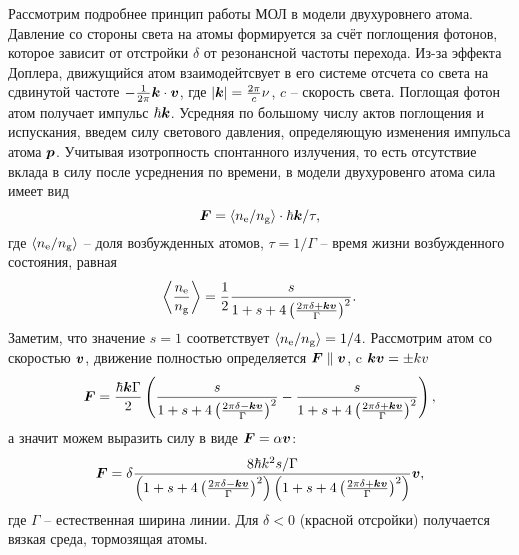 % 


\startp
{}
Рассмотрим подробнее принцип работы МОЛ в модели двухуровнего атома. Давление со стороны света на атомы формируется за счёт поглощения фотонов, которое зависит от отстройки $\delta$ от резонансной частоты перехода. Из-за эффекта Доплера, движущийся атом взаимодейтсвует в его системе отсчета со света на сдвинутой частоте $- \frac{1}{2\pi} \boldsymbol{k} \cdot \boldsymbol{v}$, где $|\boldsymbol{k}| = \frac{2\pi}{c}\nu$, $c$ -- скорость света. Поглощая фотон атом получает импульс $\hbar \boldsymbol{k}$. Усредняя по большому числу актов поглощения и испускания, введем силу светового давления, определяющую изменения импульса атома $\boldsymbol{p}$. Учитывая изотропность спонтанного излучения, то есть отсутствие вклада в силу после усреднения по времени, в модели двухуровенго атома сила имеет вид
\begin{equation}
	\boldsymbol{F} = \langle n_{\textnormal{e}} / n_{\textnormal{g}} \rangle \cdot \hbar \boldsymbol{k} / \tau,
\end{equation}
где $\langle n_{\textnormal{e}} / n_{\textnormal{g}} \rangle$ -- доля возбужденных атомов, $\tau = 1/\Gamma$ -- время жизни возбужденного состояния, равная
\begin{equation}
	\left\langle 
		\frac{n_{\textnormal{e}}}{n_{\textnormal{g}}}
	\right\rangle = \frac{1}{2} \frac{s}{1+s+4\left(\frac{2 \pi \delta + \boldsymbol{k} \boldsymbol{v}}{\Gamma}\right)^2}.
\end{equation}
Заметим, что значение $s=1$ соответствует $\langle n_{\textnormal{e}} / n_{\textnormal{g}} \rangle=1/4$. Рассмотрим атом со скоростью $\boldsymbol{v}$, движение полностью определяется $\boldsymbol{F} \parallel \boldsymbol{v}$, c $\boldsymbol{k} \boldsymbol{v} = \pm k v$
\begin{equation}
	\boldsymbol{F} = \frac{\hbar \boldsymbol{k} \Gamma}{2}\left(
		\frac{s}{1+s+4\left(\frac{2\pi \delta - \boldsymbol{k} \boldsymbol{v}}{\Gamma}\right)^2}-
		\frac{s}{1+s+4\left(\frac{2\pi \delta + \boldsymbol{k} \boldsymbol{v}}{\Gamma}\right)^2}
	\right),
	\label{eq:FM1}
\end{equation}
а значит можем выразить силу в виде $\boldsymbol{F} = \alpha \boldsymbol{v}$:
\begin{equation}
	\boldsymbol{F} = \delta \frac{8 \hbar k^2  s / \Gamma}{
		\left(
			1+s+4\left(\frac{2\pi \delta - \boldsymbol{k} \boldsymbol{v}}{\Gamma}\right)^2
		\right)\left(
			1+s+4\left(\frac{2\pi\delta+\boldsymbol{k} \boldsymbol{v}}{\Gamma}\right)^2
		\right)
	}\boldsymbol{v},
	\label{eq:FM2}
\end{equation}
где $\Gamma$ -- естественная ширина линии. Для $\delta < 0$ (красной отсройки) получается вязкая среда, тормозящая атомы. 



